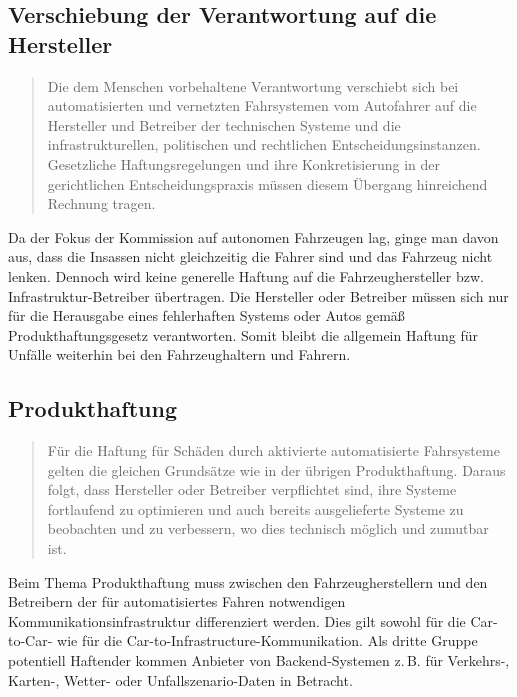 \documentclass[twoside,a4paper,12pt]{article}
\begin{document}
\subsection{Verschiebung der Verantwortung auf die Hersteller} \label{VerschiebungDerVerantwortungAufDieHersteller}
\begin{quote}
\glqq
Die dem Menschen vorbehaltene Verantwortung verschiebt sich bei automatisierten und
vernetzten Fahrsystemen vom Autofahrer auf die Hersteller und Betreiber der technischen Systeme und die infrastrukturellen, 
politischen und rechtlichen Entscheidungsinstanzen. Gesetzliche Haftungsregelungen und ihre Konkretisierung in der gerichtlichen
Entscheidungspraxis müssen diesem Übergang hinreichend Rechnung tragen.\grqq\mbox{~\cite[S. 11]{ek}}
\end{quote}
Da der Fokus der Kommission auf autonomen Fahrzeugen lag, ginge man davon aus, dass die Insassen nicht gleichzeitig die Fahrer sind und das Fahrzeug nicht lenken. Dennoch wird keine generelle Haftung auf die Fahrzeughersteller bzw. Infrastruktur-Betreiber übertragen. Die Hersteller oder Betreiber müssen sich nur für die Herausgabe eines fehlerhaften Systems oder Autos gemäß Produkthaftungsgesetz verantworten. Somit bleibt die allgemein Haftung für Unfälle weiterhin bei den Fahrzeughaltern und Fahrern.

\subsection{Produkthaftung} \label{Produkthaftung}

\begin{quote}
\glqq
Für die Haftung für Schäden durch aktivierte automatisierte Fahrsysteme gelten die gleichen Grundsätze wie in der übrigen 
Produkthaftung. Daraus folgt, dass Hersteller oder
Betreiber verpflichtet sind, ihre Systeme fortlaufend zu optimieren und auch bereits ausgelieferte Systeme zu beobachten und zu 
verbessern, wo dies technisch möglich und zumutbar ist.\grqq\mbox{~\cite[S. 12]{ek}}
\end{quote}

Beim Thema Produkthaftung muss zwischen den Fahrzeugherstellern und den Betreibern der für automatisiertes Fahren notwendigen
Kommunikationsinfrastruktur differenziert werden. Dies gilt sowohl für die Car-to-Car- wie für die Car-to-Infrastructure-Kommunikation.
Als dritte Gruppe potentiell Haftender kommen Anbieter von Backend-Systemen z.\,B. für Verkehrs-, Karten-, Wetter- oder Unfallszena\-rio-Daten 
in Betracht. 
\end{document}
